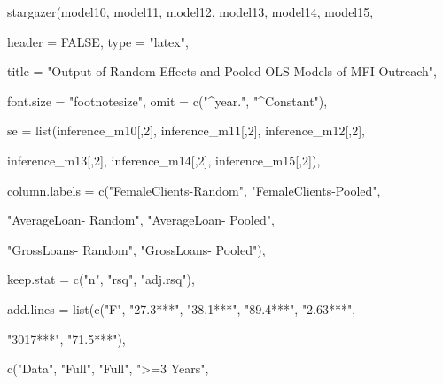 \documentclass[a4paper,nobind]{templates/ociamthesis}
\newenvironment{Shaded}{\begin{snugshade}}{\end{snugshade}}
\newcommand{\AttributeTok}[1]{\textcolor[rgb]{0.77,0.63,0.00}{#1}}
\newcommand{\ConstantTok}[1]{\textcolor[rgb]{0.00,0.00,0.00}{#1}}
\newcommand{\DecValTok}[1]{\textcolor[rgb]{0.00,0.00,0.81}{#1}}
\newcommand{\FunctionTok}[1]{\textcolor[rgb]{0.00,0.00,0.00}{#1}}
\newcommand{\NormalTok}[1]{#1}
\newcommand{\StringTok}[1]{\textcolor[rgb]{0.31,0.60,0.02}{#1}}
\renewenvironment{Shaded}
{
  \vspace{10pt}%
  \begin{snugshade}%
}{%
  \end{snugshade}%
  \vspace{8pt}%
}
\begin{document}
\begin{landscape}

\begin{Shaded}
\begin{Highlighting}[]
\FunctionTok{stargazer}\NormalTok{(model10, model11, model12, model13, model14, model15, }
          
          \AttributeTok{header =} \ConstantTok{FALSE}\NormalTok{, }\AttributeTok{type =} \StringTok{"latex"}\NormalTok{,}
          
          \AttributeTok{title =} \StringTok{"Output of Random Effects and Pooled OLS Models of MFI Outreach"}\NormalTok{, }
          
\AttributeTok{font.size =} \StringTok{"footnotesize"}\NormalTok{, }\AttributeTok{omit =} \FunctionTok{c}\NormalTok{(}\StringTok{"\^{}year."}\NormalTok{, }\StringTok{"\^{}Constant"}\NormalTok{),}

\AttributeTok{se =} \FunctionTok{list}\NormalTok{(inference\_m10[,}\DecValTok{2}\NormalTok{], inference\_m11[,}\DecValTok{2}\NormalTok{], inference\_m12[,}\DecValTok{2}\NormalTok{], }
          
\NormalTok{          inference\_m13[,}\DecValTok{2}\NormalTok{], inference\_m14[,}\DecValTok{2}\NormalTok{], inference\_m15[,}\DecValTok{2}\NormalTok{]),}

\AttributeTok{column.labels =} \FunctionTok{c}\NormalTok{(}\StringTok{"FemaleClients{-}Random"}\NormalTok{, }\StringTok{"FemaleClients{-}Pooled"}\NormalTok{, }
                  
                  \StringTok{"AverageLoan{-} Random"}\NormalTok{, }\StringTok{"AverageLoan{-} Pooled"}\NormalTok{, }
                  
                  \StringTok{"GrossLoans{-} Random"}\NormalTok{, }\StringTok{"GrossLoans{-} Pooled"}\NormalTok{), }

\AttributeTok{keep.stat =} \FunctionTok{c}\NormalTok{(}\StringTok{"n"}\NormalTok{, }\StringTok{"rsq"}\NormalTok{, }\StringTok{"adj.rsq"}\NormalTok{),}


\AttributeTok{add.lines =} \FunctionTok{list}\NormalTok{(}\FunctionTok{c}\NormalTok{(}\StringTok{"F"}\NormalTok{, }\StringTok{"27.3***"}\NormalTok{, }\StringTok{"38.1***"}\NormalTok{, }\StringTok{"89.4***"}\NormalTok{, }\StringTok{"2.63***"}\NormalTok{, }
                   
                   \StringTok{"3017***"}\NormalTok{, }\StringTok{"71.5***"}\NormalTok{), }
                 
                 \FunctionTok{c}\NormalTok{(}\StringTok{"Data"}\NormalTok{, }\StringTok{"Full"}\NormalTok{, }\StringTok{"Full"}\NormalTok{, }\StringTok{"\textgreater{}=3 Years"}\NormalTok{, }
                   

\end{Highlighting}
\end{Shaded}
\end{landscape}
\end{document}
